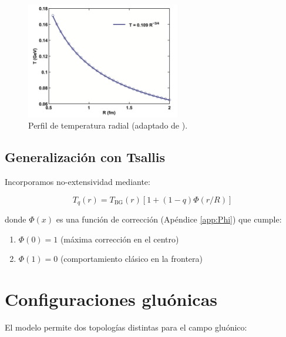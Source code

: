 \begin{figure}[h]
    \centering
    \includegraphics[width=0.6\textwidth]{./Images/T(R).png}
    \caption{Perfil de temperatura radial (adaptado de \cite{tan2019}).} %
    \label{fig:Tprofile}
\end{figure}

\subsection{Generalización con Tsallis}
Incorporamos no-extensividad mediante:

\begin{equation}
T_q(r) = T_{\text{BG}}(r)\left[1 + (1-q)\Phi(r/R)\right] \label{eq-Tq}
\end{equation}

donde $\Phi(x)$ es una función de corrección (Apéndice \ref{app:Phi}) que cumple:


\begin{enumerate}[ i. ]
    \item $\Phi(0) = 1$ (máxima corrección en el centro)
    \item $\Phi(1) = 0$ (comportamiento clásico en la frontera)
\end{enumerate}

\section{Configuraciones gluónicas}
El modelo permite dos topologías distintas para el campo gluónico:

